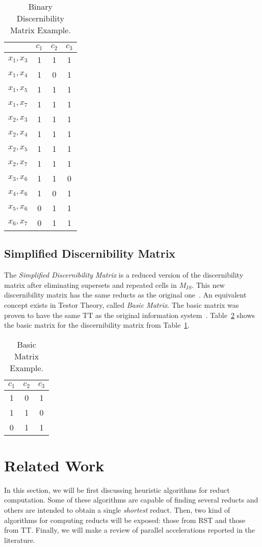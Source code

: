 \documentclass[authoryear,11pt]{elsarticle}
\begin{document}
  \begin{table}[htb]
		\caption{Binary Discernibility Matrix Example.} \label{tab_BDM}
		\centering
 	\begin{tabular}{cccc}
 		& $c_1$ & $c_2$ & $c_3$\\
 		\hline
		$x_1,x_3$ & 1 & 1 & 1 \\
		$x_1,x_4$ & 1 & 0 & 1 \\
		$x_1,x_5$ & 1 & 1 & 1 \\
		$x_1,x_7$ & 1 & 1 & 1 \\
		$x_2,x_3$ & 1 & 1 & 1 \\
		$x_2,x_4$ & 1 & 1 & 1 \\
		$x_2,x_5$ & 1 & 1 & 1 \\
		$x_2,x_7$ & 1 & 1 & 1 \\
		$x_3,x_6$ & 1 & 1 & 0 \\
		$x_4,x_6$ & 1 & 0 & 1 \\
		$x_5,x_6$ & 0 & 1 & 1 \\
		$x_6,x_7$ & 0 & 1 & 1 
 	\end{tabular}             
  \end{table}
  
\subsection{Simplified Discernibility Matrix}
  The \textit{Simplified Discernibility Matrix} is a reduced version of the discernibility matrix after
  eliminating supersets and repeated cells in $M_{IS}$. This new discernibility matrix has the same reducts
  as the original one~\citep{Yao09}. An equivalent concept exists in Testor Theory, called 
  \textit{Basic Matrix}. The basic matrix was proven to have the same TT as the original information
  system~\citep{Lazo01}. Table~\ref{tab_SDM} shows the basic matrix for the
  discernibility matrix from Table~\ref{tab_BDM}.
  
     \begin{table}[htb]
		\caption{Basic Matrix Example.} \label{tab_SDM}
		\centering
 	\begin{tabular}{ccc}
 		$c_1$ & $c_2$ & $c_3$\\
 		\hline
		1 & 0 & 1 \\
		1 & 1 & 0 \\
		0 & 1 & 1
 	\end{tabular}             
 \end{table}

\section{Related Work}\label{relatedWork}
  In this section, we will be first discussing heuristic algorithms for reduct computation. Some of these 
  algorithms are capable of finding several reducts and others are intended to obtain a single \textit{shortest} 
  reduct. Then, two kind of algorithms for computing reducts will be exposed: those 
  from RST and those from TT. Finally, we will make a review of parallel accelerations reported in the literature.  
  
\end{document}
